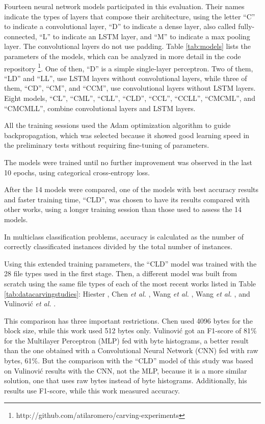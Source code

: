Fourteen neural network models participated in this evaluation.
Their names indicate the types of layers that compose their architecture, using the letter ``C'' to indicate a convolutional layer, ``D'' to indicate a dense layer, also called fully-connected, ``L'' to indicate an LSTM layer, and ``M'' to indicate a max pooling layer. The convolutional layers do not use padding.
Table \ref{tab:models} lists the parameters of the models, which can be analyzed in more detail in the code repository \footnote{http://github.com/atilaromero/carving-experiments}. One of then, ``D'' is a simple single-layer perceptron. Two of them, ``LD'' and ``LL'', use LSTM layers without convolutional layers, while three of them, ``CD'', ``CM'', and ``CCM'', use convolutional layers without LSTM layers. Eight models, ``CL'', ``CML'', ``CLL'', ``CLD'', ``CCL'', ``CCLL'', ``CMCML'', and ``CMCMLL'', combine convolutional layers and LSTM layers. 



All the training sessions used the Adam \cite{kingma_adam:_2014}
optimization algorithm to guide backpropagation, which was selected because it showed good learning speed in the preliminary tests without requiring fine-tuning of parameters.

The models were trained until no further improvement was observed in the last 10 epochs, using categorical cross-entropy loss.


After the 14 models were compared, one of the models with best accuracy results and faster training time, ``CLD'', was chosen to have its results compared with other works, using a longer training session than those used to assess the 14 models.

In multiclass classification problems, accuracy is calculated as the number of correctly classificated instances divided by the total number of instances.

Using this extended training parameters, the ``CLD'' model was trained with the 28 file types used in the first stage. Then, a different model was built from scratch using the same file types of each of the most recent works listed in Table \ref{tab:datacarvingstudies}: 
Hiester \cite{hiester_file_2018}, 
Chen \textit{et al.} \cite{chen_file_2018},
Wang \textit{et al.} \cite{wang_sparse_2018},
Wang \textit{et al.} \cite{wang_file_2018},
and
Vulinović \textit{et al.} \cite{vulinovic_neural_2019}.

This comparison has three important restrictions.
Chen used 4096 bytes for the block size, while this work used 512 bytes only.
Vulinović got an F1-score of 81\% for the Multilayer Perceptron (MLP) fed with byte histograms, a better result than the one obtained with a Convolutional Neural Network (CNN) fed with raw bytes, 61\%. But the comparison with the ``CLD'' model of this study was based on Vulinović results with the CNN, not the MLP, because it is a more similar solution, one that uses raw bytes instead of byte histograms. Additionally, his results use F1-score, while this work measured accuracy. 


